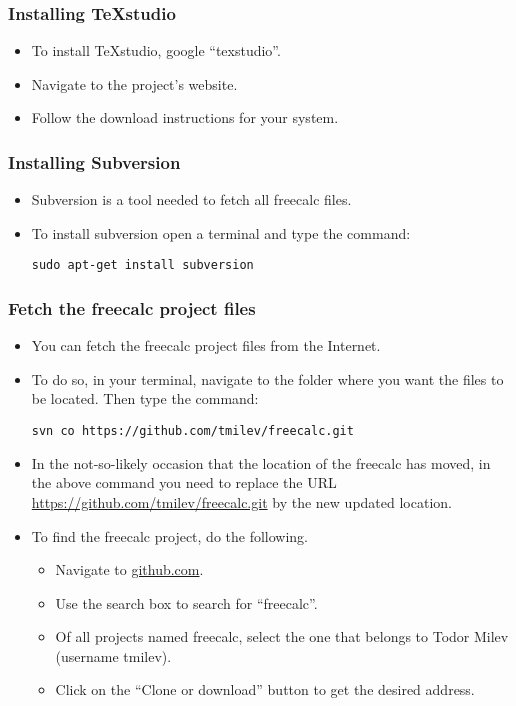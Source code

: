 \begin{frame}
\frametitle{Installing TeXstudio}

\begin{itemize}
\item To install TeXstudio, google ``texstudio''.
\item Navigate to the project's website.
\item Follow the download instructions for your system.
\end{itemize}
\end{frame}
\begin{frame}[fragile]
\frametitle{Installing Subversion}

\begin{itemize}
\item Subversion is a tool needed to fetch all freecalc files.
\item To install subversion open a terminal and type the command:
\begin{verbatim}
sudo apt-get install subversion
\end{verbatim}
\end{itemize}
\end{frame}
\begin{frame}[fragile]
\frametitle{Fetch the freecalc project files}
\begin{itemize}
\item You can fetch the freecalc project files from the Internet.
\item To do so, in your terminal, navigate to the folder where you want the files to be located. Then type the command:
\begin{verbatim}
svn co https://github.com/tmilev/freecalc.git
\end{verbatim}
\item In the not-so-likely occasion that the location of the freecalc has moved, in the above command you need to replace the URL \url{https://github.com/tmilev/freecalc.git} by the new updated location.
\item To find the freecalc project, do the following.
\begin{itemize}
\item Navigate to \url{github.com}.
\item Use the search box to search for ``freecalc''.
\item Of all projects named freecalc, select the one that belongs to Todor Milev (username tmilev).
\item Click on the ``Clone or download'' button to get the desired address.
\end{itemize}
\end{itemize}
\end{frame}